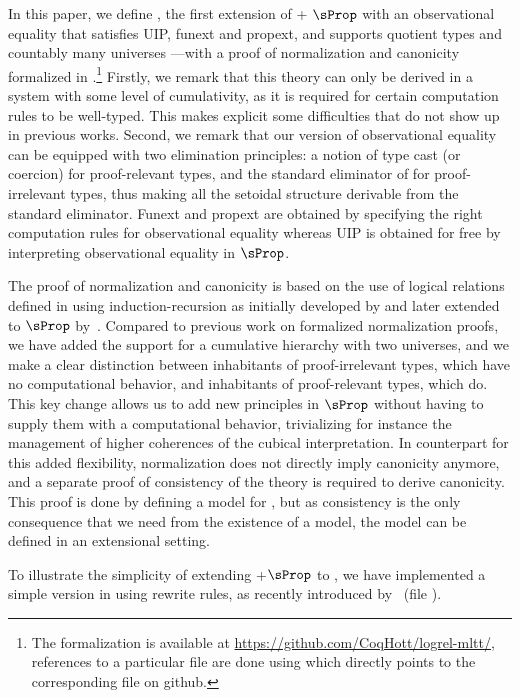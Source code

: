 In this paper, we define \SetoidTT, the first extension of \MLTT +
$\sProp$ with an observational equality that satisfies UIP, funext
and propext, and supports quotient types and countably many universes
---with a proof of normalization and canonicity formalized in \Agda.\footnote{The formalization is available at
  \url{https://github.com/CoqHott/logrel-mltt/}, references to a
  particular file are done using  which
  directly points to the corresponding file on github.}
%
Firstly, we remark that this theory can only be derived in a system with
some level of cumulativity, as it is required for certain
computation rules to be well-typed. This makes explicit some difficulties
that do not show up in previous works.
%
Second, we remark that our version of observational equality can be equipped
with two elimination principles: a notion of type cast (or coercion) for
proof-relevant types, and the standard eliminator of \MLTT for
proof-irrelevant types, thus making all the setoidal structure
derivable from the standard eliminator.
%
Funext and propext are obtained by specifying the right
computation rules for observational equality whereas UIP is obtained
for free by interpreting observational equality in $\sProp$.

The proof of normalization and canonicity is based on the use
of logical relations defined in \Agda using induction-recursion as
initially developed by  and later extended to
$\sProp$ by~.
%
Compared to previous work on formalized normalization proofs, we have added the support
for a cumulative hierarchy with two universes, and we make a clear distinction
between inhabitants of proof-irrelevant types, which have no computational
behavior, and inhabitants of proof-relevant types, which do.
%
This key change allows us to add new principles in $\sProp$ without
having to supply them with a computational behavior, trivializing for
instance the management of higher coherences of the cubical interpretation.
%
In counterpart for this added flexibility, normalization does not directly
imply canonicity anymore, and a separate proof of consistency of the
theory is required to derive canonicity.
%
This proof is done by defining a model for \SetoidTT, but as
consistency is the only consequence that we need from the existence of
a model, the model can be defined in an extensional setting.

To illustrate the simplicity of extending \MLTT+$\sProp$ to \SetoidTT,
we have implemented a simple version in
\Agda using rewrite rules, as recently introduced
by~ (file ). 


